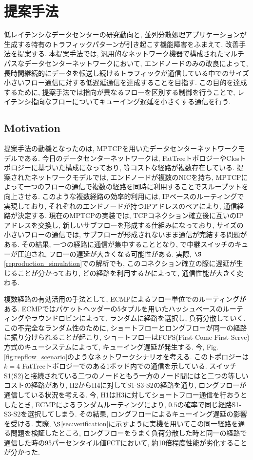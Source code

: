 \chapter{提案手法}
\label{chapter:proposal}
低レイテンシなデータセンターの研究動向と, 並列分散処理アプリケーションが生成する特有のトラフィックパターンが引き起こす機能障害をふまえて,
改善手法を提案する.
本提案手法では, 
汎用的なネットワーク機器で構成されたマルチパスなデータセンターネットワークにおいて, エンドノードのみの改良によって, 
長時間継続的にデータを転送し続けるトラフィックが通信している中でのサイズ小さいフロー通信に対する低遅延通信を達成することを目指す.
この目的を達成するために, 提案手法では指向が異なるフローを区別する制御を行うことで, レイテンシ指向なフローについてキューイング遅延を小さくする通信を行う.

\section{Motivation}
提案手法の動機となったのは, MPTCPを用いたデータセンターネットワークモデルである\cite{improving}.
今日のデータセンターネットワークは, FatTreeトポロジーやClosトポロジーに基づいた構成になっており\cite{dctcp, vl2},
等コストな経路が複数存在している. 
提案されたネットワークモデルでは, エンドノードが複数のNICを持ち,
MPTCPによって一つのフローの通信で複数の経路を同時に利用することでスループットを向上させる.
このような複数経路の効率的利用には, IPベースのルーティングで実現しており, それぞれのエンドノードが持つIPアドレスのペアにより, 通信経路が決定する.
現在のMPTCPの実装では, TCPコネクション確立後に互いのIPアドレスを交換し,
新しいサブフローを形成する仕組みになっており, サイズの小さいフローの通信では, サブフローが形成されないまま通信が完結する問題がある. 
その結果, 一つの経路に通信が集中することとなり, で中継スイッチのキューが圧迫され, フローの遅延が大きくなる可能性がある. 
実際, $\S$\ref{reproduction_simulation}での解析でも,
このコネクション確立の際に遅延が生じることが分かっており\cite{mptcp_ana}, どの経路を利用するかによって, 通信性能が大きく変わる.

複数経路の有効活用の手法として, ECMPによるフロー単位でのルーティングがある. 
ECMPではパケットヘッダーの5タプルを用いたハッシュベースのルーティングやラウンドロビンによって, ランダムに経路を選択し, 負荷分散していく. 
この不完全なランダム性のために, ショートフローとロングフローが同一の経路に振り分けられることが起こり,
ショートフローはFCFS(First-Come-First-Serve)方式のキューシステムによって, キューイング遅延が発生する. 
今, Fig.\ref{fig:repflow_scenario}のようなネットワークシナリオを考える. 
このトポロジーは$k=4$ FatTreeトポロジーでのある1ポッド内での通信を示している. 
スイッチS1(S2)と接続されている二つのノードともう一方のノード間にはと二つの等しいコストの経路があり, H2からH4に対してS1-S3-S2の経路を通り,
ロングフローが通信している状況を考える. 
今, H1はH3に対してショートフロー通信を行おうとしたとき, ECMPによるランダムルーティングにより,
$0.5$の確率で同じ経路S1-S3-S2を選択してしまう. 
その結果, ロングフローによるキューイング遅延の影響を受ける. 
実際, $\S$\ref{sec:verification}に示すように実機を用いてこの同一経路を通る問題を検証したところ,
ロングフローをうまく負荷分散した時と同一の経路で通信した時の95パーセンタイル値FCTにおいて,
約10倍程度性能が劣化することが分かった\cite{mptcp_ana2}.


